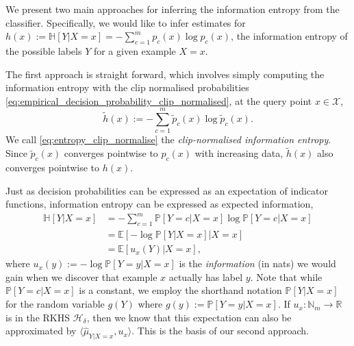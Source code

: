 \documentclass{article}
\begin{document}
		We present two main approaches for inferring the information entropy from the classifier. Specifically, we would like to infer estimates for $h(x) := \mathbb{H}[Y | X = x] = - \sum_{c = 1}^{m} p_{c}(x) \log{p_{c}(x)} $, the information entropy of the possible labels $Y$ for a given example $X = x$.
		
		The first approach is straight forward, which involves simply computing the information entropy with the clip normalised probabilities \eqref{eq:empirical_decision_probability_clip_normalised}, at the query point $x \in \mathcal{X}$,
		\begin{equation}
			\tilde{h}(x) := - \sum_{c = 1}^{m} \tilde{p}_{c}(x) \log{\tilde{p}_{c}(x)}.
		\label{eq:entropy_clip_normalise}
		\end{equation}
		We call \eqref{eq:entropy_clip_normalise} the \textit{clip-normalised information entropy}. Since $\tilde{p}_{c}(x)$ converges pointwise to $p_{c}(x)$ with increasing data, $\tilde{h}(x)$ also converges pointwise to $h(x)$.
		
		Just as decision probabilities can be expressed as an expectation of indicator functions, information entropy can be expressed as expected information,
		\begin{equation}
			\begin{aligned}
				\mathbb{H}[Y | X = x] &= - \sum_{c = 1}^{m} \mathbb{P}[Y = c| X = x] \log{\mathbb{P}[Y = c | X = x]} \\
				&= \mathbb{E}[- \log{\mathbb{P}[Y | X = x]} | X = x] \\
				&= \mathbb{E}[u_{x}(Y) | X = x],
			\end{aligned}
		\end{equation}
		where $u_{x}(y) := - \log{\mathbb{P}[Y = y | X = x]}$ is the \textit{information} (in nats) we would gain when we discover that example $x$ actually has label $y$. Note that while $\mathbb{P}[Y = c | X = x]$ is a constant, we employ the shorthand notation $\mathbb{P}[Y| X = x]$ for the random variable $g(Y)$ where $g(y) := \mathbb{P}[Y = y | X = x]$. If $u_{x} : \mathbb{N}_{m} \to \mathbb{R}$ is in the RKHS $\mathcal{H}_{\delta}$, then we know that this expectation can also be approximated by $\langle \hat{\mu}_{Y | X = x}, u_{x} \rangle$. This is the basis of our second approach.
		
\end{document}
